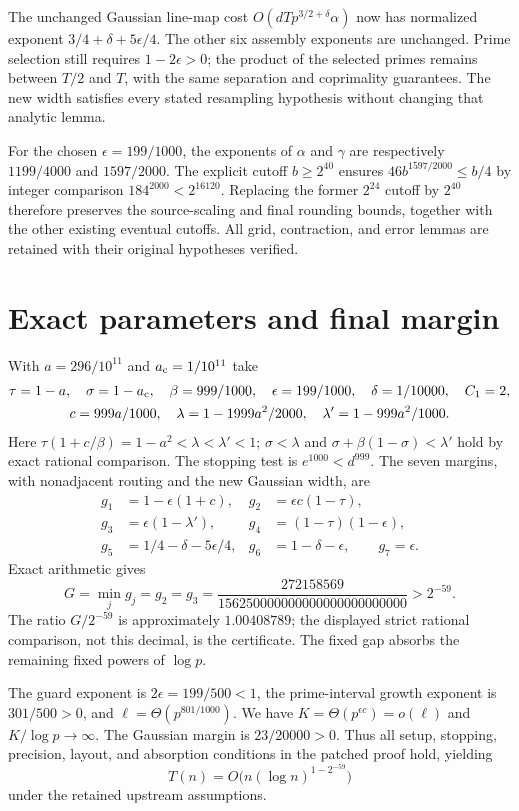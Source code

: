 \documentclass[11pt]{article}
\begin{document}
The unchanged Gaussian line-map cost $O(dTp^{3/2+\delta}\alpha)$ now has
normalized exponent $3/4+\delta+5\epsilon/4$. The other six assembly
exponents are unchanged. Prime selection still requires $1-2\epsilon>0$;
the product of the selected primes remains between $T/2$ and $T$, with the
same separation and coprimality guarantees. The new width satisfies every
stated resampling hypothesis without changing that analytic lemma.

For the chosen $\epsilon=199/1000$, the exponents of $\alpha$ and $\gamma$
are respectively $1199/4000$ and $1597/2000$. The explicit cutoff
$b\ge2^{40}$ ensures $46b^{1597/2000}\le b/4$ by integer comparison
$184^{2000}<2^{16120}$. Replacing the former $2^{24}$ cutoff by $2^{40}$
therefore preserves the source-scaling and final rounding bounds, together
with the other existing eventual cutoffs. All grid, contraction, and error
lemmas are retained with their original hypotheses verified.

\section{Exact parameters and final margin}
With $a=296/10^{11}$ and $a_{\rm c}=1/10^{11}$ take
\begin{gather*}
 \tau=1-a,\quad\sigma=1-a_{\rm c},\quad\beta=999/1000,
 \quad\epsilon=199/1000,\quad\delta=1/10000,\quad C_1=2,\\
 c=999a/1000,\quad\lambda=1-1999a^2/2000,
 \quad\lambda'=1-999a^2/1000.
\end{gather*}
Here $\tau(1+c/\beta)=1-a^2<\lambda<\lambda'<1$;
$\sigma<\lambda$ and $\sigma+\beta(1-\sigma)<\lambda'$ hold by exact
rational comparison. The stopping test is $e^{1000}<d^{999}$.
The seven margins, with nonadjacent routing and the new Gaussian width, are
\begin{align*}
 g_1&=1-\epsilon(1+c),&g_2&=\epsilon c(1-\tau),\\
 g_3&=\epsilon(1-\lambda'),&g_4&=(1-\tau)(1-\epsilon),\\
 g_5&=1/4-\delta-5\epsilon/4,&g_6&=1-\delta-\epsilon,\qquad g_7=\epsilon.
\end{align*}
Exact arithmetic gives
\[
 G=\min_j g_j=g_2=g_3
 =\frac{272158569}{156250000000000000000000000}>2^{-59}.
\]
The ratio $G/2^{-59}$ is approximately $1.00408789$; the displayed strict
rational comparison, not this decimal, is the certificate. The fixed gap
absorbs the remaining fixed powers of $\log p$.

The guard exponent is $2\epsilon=199/500<1$, the prime-interval growth
exponent is $301/500>0$, and $\ell=\Theta(p^{801/1000})$.
We have $K=\Theta(p^{\epsilon c})=o(\ell)$ and $K/\log p\to\infty$.
The Gaussian margin is $23/20000>0$. Thus all setup, stopping, precision,
layout, and absorption conditions in the patched proof hold, yielding
\[
 T(n)=O\bigl(n(\log n)^{1-2^{-59}}\bigr)
\]
under the retained upstream assumptions.
\end{document}
